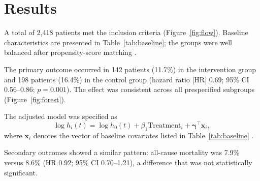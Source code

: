 \section{Results}
\label{sec:results}

A total of 2,418 patients met the inclusion criteria (Figure~\ref{fig:flow}). Baseline characteristics are presented in Table~\ref{tab:baseline}; the groups were well balanced after propensity-score matching \cite{austin2011introduction}.

The primary outcome occurred in 142 patients (11.7\%) in the intervention group and 198 patients (16.4\%) in the control group (hazard ratio [HR] 0.69; 95\% CI 0.56--0.86; $p = 0.001$). The effect was consistent across all prespecified subgroups (Figure~\ref{fig:forest}).

The adjusted model was specified as
\begin{equation}
  \log h_i(t) = \log h_0(t) + \beta_1 \text{Treatment}_i + \boldsymbol{\gamma}^\top \mathbf{x}_i ,
  \label{eq:cox}
\end{equation}
where $\mathbf{x}_i$ denotes the vector of baseline covariates listed in Table~\ref{tab:baseline} \cite{cox1972regression, therneau2000modeling}.

Secondary outcomes showed a similar pattern: all-cause mortality was 7.9\% versus 8.6\% (HR 0.92; 95\% CI 0.70--1.21), a difference that was not statistically significant.
